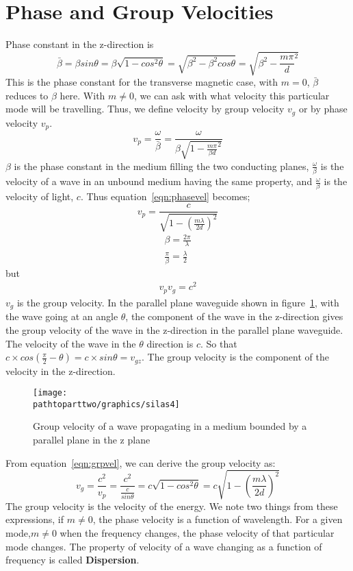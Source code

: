 \section{Phase and Group Velocities}
Phase constant in the z-direction is
\begin{dmath*}
\bar{\beta} = \beta sin\theta = \beta \sqrt{1- cos^{2}\theta} =\sqrt{\beta^{2} -\beta^{2}cos\theta} = \sqrt{\beta^{2} -\frac{m\pi}{d}^{2}}
\end{dmath*}
This is the phase constant for the transverse magnetic case, with $m = 0$, $\bar{\beta}$ reduces to $\beta$ here. With $m\neq 0$, we can ask with what velocity this particular mode will be travelling. Thus, we define velocity by group velocity $v_{g}$ or by phase velocity $v_{p}$. 
\begin{dmath}
 v_{p}=\frac{\omega}{\bar{\beta}} =\frac{\omega}{\beta \sqrt{1- \frac{m \pi}{\beta d}^{2}}}
\label{eqn:phasevel}
\end{dmath}
$\beta$ is the phase constant in the medium filling the two conducting planes, $\frac{\omega}{\beta}$ is the velocity of a wave in an unbound medium having the same property, and $\frac{\omega}{\beta}$ is the velocity of light, $c$. Thus equation~\ref{eqn:phasevel} becomes;
\begin{equation*}
v_{p} =\frac{c}{\sqrt{1-(\frac{m\lambda}{2d})^{2}}}
\end{equation*}
\begin{align*}
\beta =\frac{2\pi}{\lambda}\\
\frac{\pi}{\beta} =\frac{\lambda}{2}
\end{align*}
but 
\begin{align}
v_{p} v_{g}= c^{2}
\label{eqn:grpvel}
\end{align}
$v_{g}$ is the group velocity. In the parallel plane waveguide shown in figure~\ref{fig:silas4}, with the wave going at an angle $\theta$, the component of the wave in the z-direction gives the group velocity of the wave in the z-direction in the parallel plane waveguide. The velocity of the wave in the $\theta$ direction is $c$. So that $c\times cos(\frac{\pi}{2} - \theta)= c\times sin\theta= v_{gz}$. The group velocity is the component of the velocity in the z-direction.
\begin{figure}[h]
\centering
\texttt{[image: \\pathtoparttwo/graphics/silas4]}
\caption{Group velocity of a wave propagating in a medium bounded by a parallel plane in the z plane}
\label{fig:silas4}
\end{figure}
From equation~\ref{eqn:grpvel}, we can derive the group velocity as:
\begin{dmath*}
v_g = \frac{c^2}{v_p} = \frac{c^2}{\frac{c}{sin\theta}}= c\sqrt{1-cos^{2}\theta} =c\sqrt{1-(\frac{m\lambda}{2d})^{2}}
\end{dmath*}
The group velocity is the velocity of the energy. We note two things from these expressions, if $m \neq 0$, the phase velocity is a function of wavelength. For a given mode,$m \neq 0$ when the frequency changes, the phase velocity of that particular mode changes. The property of velocity of a wave changing as a function of frequency is called \textbf{Dispersion}. 


